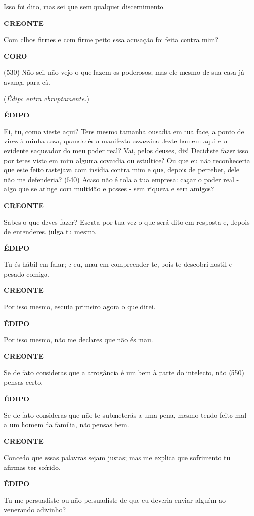 Isso foi dito, mas sei que sem qualquer discernimento.

\textbf{CREONTE}

Com olhos firmes e com firme peito essa acusação foi feita contra mim?

\textbf{CORO}

(530) Não sei, não vejo o que fazem os poderosos; mas ele mesmo de sua
casa já avança para cá.

(\emph{Édipo entra abruptamente.})

\textbf{ÉDIPO}

Ei, tu, como vieste aqui? Tens mesmo tamanha ousadia em tua face, a
ponto de vires à minha casa, quando és o manifesto assassino deste homem
aqui e o evidente saqueador do meu poder real? Vai, pelos deuses, diz!
Decidiste fazer isso por teres visto em mim alguma covardia ou
estultice? Ou que eu não reconheceria que este feito rastejava com
insídia contra mim e que, depois de perceber, dele não me defenderia?
(540) Acaso não é tola a tua empresa: caçar o poder real - algo que se
atinge com multidão e posses - sem riqueza e sem amigos?

\textbf{CREONTE}

Sabes o que deves fazer? Escuta por tua vez o que será dito em resposta
e, depois de entenderes, julga tu mesmo.

\textbf{ÉDIPO}

Tu és hábil em falar; e eu, mau em compreender-te, pois te descobri
hostil e pesado comigo.

\textbf{CREONTE}

Por isso mesmo, escuta primeiro agora o que direi.

\textbf{ÉDIPO}

Por isso mesmo, não me declares que não és mau.

\textbf{CREONTE}

Se de fato consideras que a arrogância é um bem à parte do intelecto,
não (550) pensas certo.

\textbf{ÉDIPO}

Se de fato consideras que não te submeterás a uma pena, mesmo tendo
feito mal a um homem da família, não pensas bem.

\textbf{CREONTE}

Concedo que essas palavras sejam justas; mas me explica que sofrimento
tu afirmas ter sofrido.

\textbf{ÉDIPO}

Tu me persuadiste ou não persuadiste de que eu deveria enviar alguém ao
venerando adivinho?

